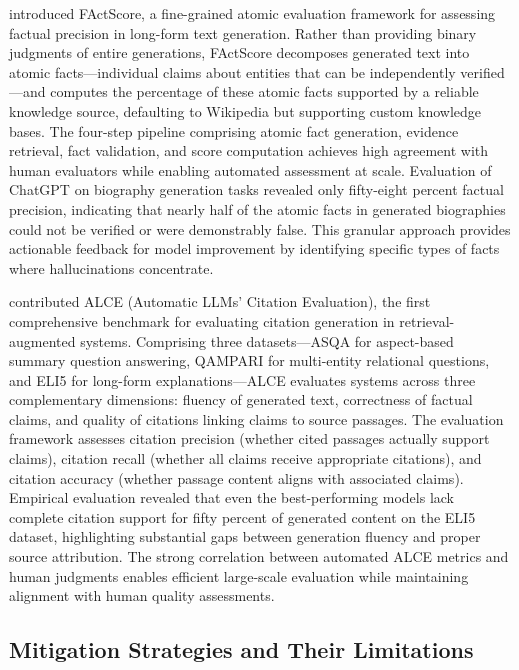 \citet{min2023factscore} introduced FActScore, a fine-grained atomic evaluation framework for assessing factual precision in long-form text generation. Rather than providing binary judgments of entire generations, FActScore decomposes generated text into atomic facts---individual claims about entities that can be independently verified---and computes the percentage of these atomic facts supported by a reliable knowledge source, defaulting to Wikipedia but supporting custom knowledge bases. The four-step pipeline comprising atomic fact generation, evidence retrieval, fact validation, and score computation achieves high agreement with human evaluators while enabling automated assessment at scale. Evaluation of ChatGPT on biography generation tasks revealed only fifty-eight percent factual precision, indicating that nearly half of the atomic facts in generated biographies could not be verified or were demonstrably false. This granular approach provides actionable feedback for model improvement by identifying specific types of facts where hallucinations concentrate.

\citet{gao2023enabling} contributed ALCE (Automatic LLMs' Citation Evaluation), the first comprehensive benchmark for evaluating citation generation in retrieval-augmented systems. Comprising three datasets---ASQA for aspect-based summary question answering, QAMPARI for multi-entity relational questions, and ELI5 for long-form explanations---ALCE evaluates systems across three complementary dimensions: fluency of generated text, correctness of factual claims, and quality of citations linking claims to source passages. The evaluation framework assesses citation precision (whether cited passages actually support claims), citation recall (whether all claims receive appropriate citations), and citation accuracy (whether passage content aligns with associated claims). Empirical evaluation revealed that even the best-performing models lack complete citation support for fifty percent of generated content on the ELI5 dataset, highlighting substantial gaps between generation fluency and proper source attribution. The strong correlation between automated ALCE metrics and human judgments enables efficient large-scale evaluation while maintaining alignment with human quality assessments.

\subsection{Mitigation Strategies and Their Limitations}

